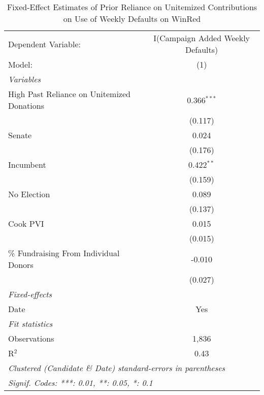 
\begin{table}[htbp]
   \caption{\label{tab:heterogeneity-effect-unitem-pnas-treat} Fixed-Effect Estimates of Prior Reliance on Unitemized Contributions on Use of Weekly Defaults on WinRed}
   \centering
   \begin{tabular}{lc}
      \tabularnewline \midrule \midrule
      Dependent Variable:                        & I(Campaign Added Weekly Defaults)\\  
      Model:                                     & (1)\\  
      \midrule
      \emph{Variables}\\
      High Past Reliance on Unitemized Donations & 0.366$^{***}$\\   
                                                 & (0.117)\\   
      Senate                                     & 0.024\\   
                                                 & (0.176)\\   
      Incumbent                                  & 0.422$^{**}$\\   
                                                 & (0.159)\\   
      No Election                                & 0.089\\   
                                                 & (0.137)\\   
      Cook PVI                                   & 0.015\\   
                                                 & (0.015)\\   
      \% Fundraising From Individual Donors      & -0.010\\   
                                                 & (0.027)\\   
      \midrule
      \emph{Fixed-effects}\\
      Date                                       & Yes\\  
      \midrule
      \emph{Fit statistics}\\
      Observations                               & 1,836\\  
      R$^2$                                      & 0.43\\  
      \midrule \midrule
      \multicolumn{2}{l}{\emph{Clustered (Candidate \& Date) standard-errors in parentheses}}\\
      \multicolumn{2}{l}{\emph{Signif. Codes: ***: 0.01, **: 0.05, *: 0.1}}\\
   \end{tabular}
\end{table}


